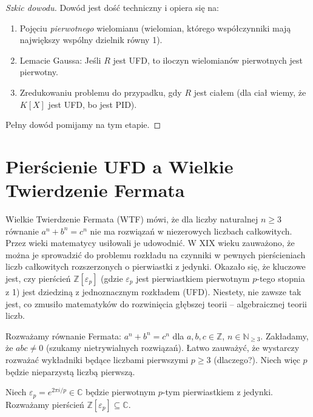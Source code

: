 \begin{proof}[Szkic dowodu]
Dowód jest dość techniczny i opiera się na:
\begin{enumerate}[label=\arabic*)]
    \item Pojęciu \emph{pierwotnego} wielomianu (wielomian, którego współczynniki mają największy wspólny dzielnik równy 1).
    \item Lemacie Gaussa: Jeśli $R$ jest UFD, to iloczyn wielomianów pierwotnych jest pierwotny.
    \item Zredukowaniu problemu do przypadku, gdy $R$ jest ciałem (dla ciał wiemy, że $K[X]$ jest UFD, bo jest PID).
\end{enumerate}
Pełny dowód pomijamy na tym etapie.
\end{proof}
\section*{Pierścienie UFD a Wielkie Twierdzenie Fermata}

\begin{intuition}
Wielkie Twierdzenie Fermata (WTF) mówi, że dla liczby naturalnej $n \geq 3$ równanie $a^n + b^n = c^n$ nie ma rozwiązań w niezerowych liczbach całkowitych. Przez wieki matematycy usiłowali je udowodnić. W XIX wieku zauważono, że można je sprowadzić do problemu rozkładu na czynniki w pewnych pierścieniach liczb całkowitych rozszerzonych o pierwiastki z jedynki. Okazało się, że kluczowe jest, czy pierścień $\mathbb{Z}[\varepsilon_p]$ (gdzie $\varepsilon_p$ jest pierwiastkiem pierwotnym $p$-tego stopnia z 1) jest dziedziną z jednoznacznym rozkładem (UFD). Niestety, nie zawsze tak jest, co zmusiło matematyków do rozwinięcia głębszej teorii – algebraicznej teorii liczb.
\end{intuition}

\begin{context}
Rozważamy równanie Fermata: $a^n + b^n = c^n$ dla $a,b,c \in \mathbb{Z}$, $n \in \mathbb{N}_{\geq 3}$. Zakładamy, że $abc \neq 0$ (szukamy nietrywialnych rozwiązań). Łatwo zauważyć, że wystarczy rozważać wykładniki będące liczbami pierwszymi $p \geq 3$ (dlaczego?). Niech więc $p$ będzie nieparzystą liczbą pierwszą.
\end{context}

Niech $\varepsilon_p = e^{2\pi i / p} \in \mathbb{C}$ będzie pierwotnym $p$-tym pierwiastkiem z jedynki. Rozważamy pierścień $\mathbb{Z}[\varepsilon_p] \subseteq \mathbb{C}$.

